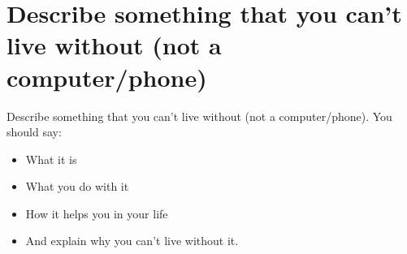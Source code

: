 \section{Describe something that you can't live without (not a computer/phone)}
\begin{ieltsprompt}
Describe something that you can't live without (not a computer/phone).
You should say:
\begin{itemize}[leftmargin=2em, itemsep=2pt]
\item What it is
\item What you do with it
\item How it helps you in your life
\item And explain why you can't live without it.
\end{itemize}
\end{ieltsprompt}
